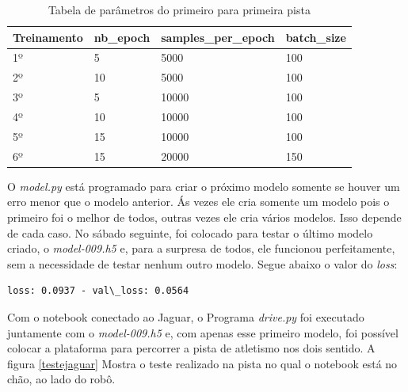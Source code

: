 \begin{table}[H]
\centering
\caption{ Tabela de parâmetros do primeiro para primeira pista}
\label{parametros1}
\begin{tabular}{|l|l|l|l|}
\hline
\textbf{Treinamento} & \textbf{nb\_epoch} & \textbf{samples\_per\_epoch} & \textbf{batch\_size} \\ \hline
1º        & 5         & 5000                & 100         \\ 
2º        & 10        & 5000                & 100         \\ 
3º        & 5         & 10000               & 100         \\ 
4º        & 10        & 10000               & 100         \\ 
5º        & 15        & 10000               & 100         \\ 
6º        & 15        & 20000               & 150         \\ \hline
\end{tabular}
\end{table}

O \textit{model.py} está programado para criar o próximo modelo somente se houver um erro menor que o modelo anterior. Ás vezes ele cria somente um modelo pois o primeiro foi o melhor de todos, outras vezes ele cria vários modelos. Isso depende de cada caso.
No sábado seguinte, foi colocado para testar o último modelo criado, o \textit{model-009.h5} e, para a surpresa de todos, ele funcionou perfeitamente, sem a necessidade de testar nenhum outro modelo. Segue abaixo o valor do \textit{loss}:

\begin{lstlisting}
loss: 0.0937 - val\_loss: 0.0564
\end{lstlisting}

Com o notebook conectado ao Jaguar, o Programa \textit{drive.py} foi executado juntamente com o \textit{model-009.h5} e, com apenas esse primeiro modelo, foi possível colocar a plataforma para percorrer a pista de atletismo nos dois sentido. A figura \ref{testejaguar} Mostra o teste realizado na pista no qual o notebook está no chão, ao lado do robô.

